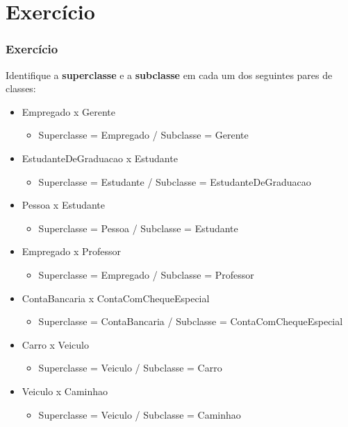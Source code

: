 \documentclass[aspectratio=169]{beamer}
\begin{document}
\section{Exercício}

\begin{frame}\frametitle{Exercício}
Identifique a \textbf{superclasse} e a \textbf{subclasse} em cada um dos seguintes pares de classes:
\begin{itemize}
	\item Empregado x Gerente
\pause
	\begin{itemize}
		\item Superclasse = Empregado / Subclasse = Gerente
	\end{itemize}
	\item EstudanteDeGraduacao x Estudante
\pause
	\begin{itemize}
		\item Superclasse = Estudante / Subclasse = EstudanteDeGraduacao
	\end{itemize}
	\item Pessoa x Estudante
\pause
	\begin{itemize}
		\item Superclasse = Pessoa / Subclasse = Estudante
	\end{itemize}
	\item Empregado x Professor
\pause
	\begin{itemize}
		\item Superclasse = Empregado / Subclasse = Professor
	\end{itemize}
	\item ContaBancaria x ContaComChequeEspecial
\pause
	\begin{itemize}
		\item Superclasse = ContaBancaria / Subclasse = ContaComChequeEspecial
	\end{itemize}
	\item Carro x Veiculo
\pause
	\begin{itemize}
		\item Superclasse = Veiculo / Subclasse = Carro
	\end{itemize}
	\item Veiculo x Caminhao
\pause
	\begin{itemize}
		\item Superclasse = Veiculo / Subclasse = Caminhao
	\end{itemize}
\end{itemize}
\end{frame}
\end{document}
